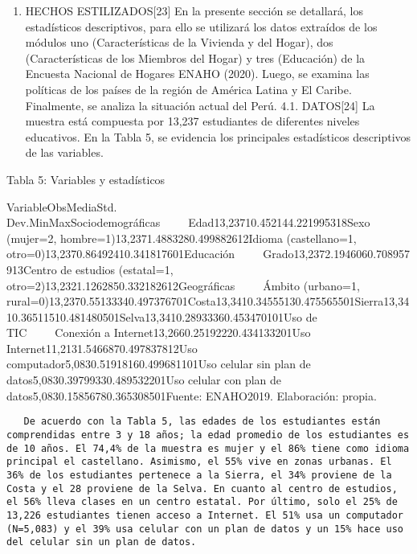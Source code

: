 \begin{enumerate}
\def\labelenumi{\arabic{enumi}.}
\setcounter{enumi}{3}
\tightlist
\item
  HECHOS ESTILIZADOS{[}23{]} En la presente sección se detallará, los
  estadísticos descriptivos, para ello se utilizará los datos extraídos
  de los módulos uno (Características de la Vivienda y del Hogar), dos
  (Características de los Miembros del Hogar) y tres (Educación) de la
  Encuesta Nacional de Hogares ENAHO (2020). Luego, se examina las
  políticas de los países de la región de América Latina y El Caribe.
  Finalmente, se analiza la situación actual del Perú. 4.1.
  DATOS{[}24{]} La muestra está compuesta por 13,237 estudiantes de
  diferentes niveles educativos. En la Tabla 5, se evidencia los
  principales estadísticos descriptivos de las variables.
\end{enumerate}

Tabla 5: Variables y estadísticos

VariableObsMediaStd.
Dev.MinMaxSociodemográficas~~~~~Edad13,23710.452144.221995318Sexo
(mujer=2, hombre=1)13,2371.4883280.499882612Idioma (castellano=1,
otro=0)13,2370.86492410.341817601Educación~~~~~Grado13,2372.1946060.708957913Centro
de estudios (estatal=1,
otro=2)13,2321.1262850.332182612Geográficas~~~~~Ámbito (urbano=1,
rural=0)13,2370.55133340.497376701Costa13,3410.34555130.475565501Sierra13,3410.36511510.481480501Selva13,3410.28933360.453470101Uso
de TIC~~~~~Conexión a Internet13,2660.25192220.434133201Uso
Internet11,2131.5466870.497837812Uso
computador5,0830.51918160.499681101Uso celular sin plan de
datos5,0830.39799330.489532201Uso celular con plan de
datos5,0830.15856780.365308501Fuente: ENAHO2019. Elaboración: propia.

\begin{verbatim}
   De acuerdo con la Tabla 5, las edades de los estudiantes están comprendidas entre 3 y 18 años; la edad promedio de los estudiantes es de 10 años. El 74,4% de la muestra es mujer y el 86% tiene como idioma principal el castellano. Asimismo, el 55% vive en zonas urbanas. El 36% de los estudiantes pertenece a la Sierra, el 34% proviene de la Costa y el 28 proviene de la Selva. En cuanto al centro de estudios, el 56% lleva clases en un centro estatal. Por último, solo el 25% de 13,226 estudiantes tienen acceso a Internet. El 51% usa un computador (N=5,083) y el 39% usa celular con un plan de datos y un 15% hace uso del celular sin un plan de datos.
\end{verbatim}

